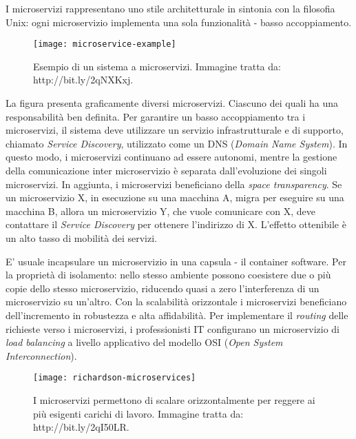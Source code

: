 I microservizi rappresentano uno stile architetturale in sintonia con la filosofia Unix: ogni microservizio implementa una sola funzionalità - basso accoppiamento.

\begin{figure}[htbp]
	\begin{center}
		\texttt{[image: microservice-example]}
		\caption{Esempio di un sistema a microservizi. Immagine tratta da: http://bit.ly/2qNXKxj.}
	\end{center}
\end{figure}

La figura presenta graficamente diversi microservizi. Ciascuno dei quali ha una responsabilità ben definita. Per garantire un basso accoppiamento tra i microservizi, il sistema deve utilizzare un servizio infrastrutturale e di supporto, chiamato \textit{Service Discovery}, utilizzato come un DNS (\textit{Domain Name System}). In questo modo, i microservizi continuano ad essere autonomi, mentre la gestione della comunicazione inter microservizio è separata dall'evoluzione dei singoli microservizi. 
In aggiunta, i microservizi beneficiano della \textit{space transparency}. Se un microservizio X, in esecuzione su una macchina A, migra per eseguire su una macchina B, allora un microservizio Y, che vuole comunicare con X, deve contattare il \textit{Service Discovery} per ottenere l'indirizzo di X. L'effetto ottenibile è un alto tasso di mobilità dei servizi.  

E' usuale incapsulare un microservizio in una capsula - il container software. Per la proprietà di isolamento: nello stesso ambiente possono coesistere due o più copie dello stesso microservizio, riducendo quasi a zero l'interferenza di un microservizio su un'altro. 
Con la scalabilità orizzontale i microservizi beneficiano dell'incremento in robustezza e alta affidabilità. Per implementare il \textit{routing} delle richieste verso i microservizi, i professionisti IT configurano un microservizio di \textit{load balancing} a livello applicativo del modello OSI (\textit{Open System Interconnection}).


\begin{figure}[htbp]
	\begin{center}
		\texttt{[image: richardson-microservices]}
		\caption{I microservizi permettono di scalare orizzontalmente per reggere ai più esigenti carichi di lavoro. Immagine tratta da: http://bit.ly/2qI50LR.}
	\end{center}
\end{figure}

